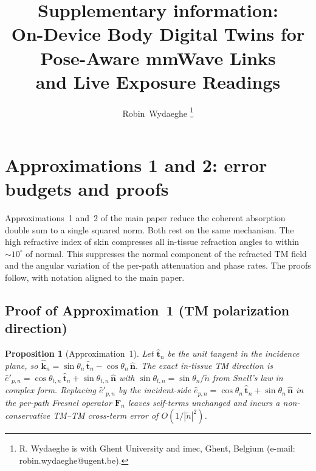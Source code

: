 \documentclass[10pt,journal,twocolumn]{IEEEtran}
\title{Supplementary information:\\
On-Device Body Digital Twins for Pose-Aware mmWave Links\\
and Live Exposure Readings}
\author{Robin~Wydaeghe%
  \thanks{R. Wydaeghe is with Ghent University and imec, Ghent, Belgium
  (e-mail: robin.wydaeghe@ugent.be).}}
\newcommand{\nhat}{\hat{\bm{n}}}
\newcommand{\Fn}{\mathbf{F}_n}
\newcommand{\ntilde}{\tilde{n}}
\theoremstyle{plain}
\newtheorem{proposition}{Proposition}[section]
\theoremstyle{definition}
\begin{document}
\maketitle

\section{Approximations 1 and 2: error budgets and proofs}\label{si:approx-proofs}

Approximations~1 and~2 of the main paper reduce the coherent absorption
double sum to a single squared norm. Both rest on the same mechanism.
The high refractive index of skin compresses all in-tissue refraction
angles to within $\sim\!10^{\circ}$ of normal. This suppresses the
normal component of the refracted TM field and the angular variation
of the per-path attenuation and phase rates. The proofs follow,
with notation aligned to the main paper.

\subsection{Proof of Approximation~1 (TM polarization direction)}

\begin{proposition}[Approximation~1]\label{prop:S-approx1}
Let $\hat{\bm{t}}_n$ be the unit tangent in the incidence plane, so
$\hat{\bm{k}}_n = \sin\theta_n\,\hat{\bm{t}}_n - \cos\theta_n\,\nhat$.
The exact in-tissue TM direction is $\hat{e}'_{p,n} =
\cos\theta_{t,n}\,\hat{\bm{t}}_n + \sin\theta_{t,n}\,\nhat$ with
$\sin\theta_{t,n} = \sin\theta_n / \ntilde$ from Snell's law in
complex form. Replacing $\hat{e}'_{p,n}$ by the incident-side
$\hat{e}_{p,n} = \cos\theta_n\,\hat{\bm{t}}_n + \sin\theta_n\,\nhat$
in the per-path Fresnel operator $\Fn$ leaves self-terms unchanged
and incurs a non-conservative TM--TM cross-term error of
$O(1/|\ntilde|^2)$.
\end{proposition}
\end{document}
